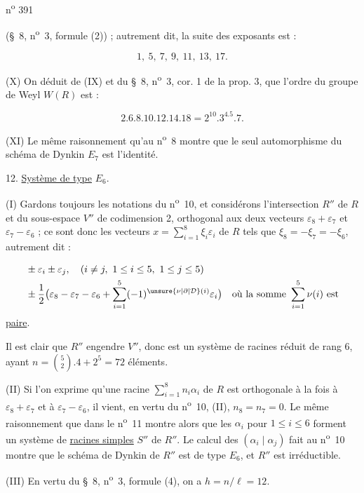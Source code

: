 \hfill n\textsuperscript{o} 391

(\S~8, n\textsuperscript{o}~3, formule (2)) ; autrement dit, la suite des exposants est :

\[
1,\ 5,\ 7,\ 9,\ 11,\ 13,\ 17.
\]

(X) On déduit de (IX) et du \S~8, n\textsuperscript{o}~3, cor. 1 de la prop. 3, que l'ordre du groupe de Weyl $W(R)$ est :

\[
2.6.8.10.12.14.18=2^{10}.3^4.5.7.
\]

(XI) Le même raisonnement qu'au n\textsuperscript{o}~8 montre que le seul automorphisme du schéma de Dynkin $E_7$ est l'identité.

12. \uline{Système de type} $E_6$.

(I) Gardons toujours les notations du n\textsuperscript{o}~10, et considérons l'intersection $R''$ de $R$ et du sous-espace $V''$ de codimension 2, orthogonal aux deux vecteurs $\varepsilon_8+\varepsilon_7$ et $\varepsilon_7-\varepsilon_6$ ; ce sont donc les vecteurs $x=\displaystyle\sum_{i=1}^{8}\xi_i\varepsilon_i$ de $R$ tels que $\xi_8=-\xi_7=-\xi_6$, autrement dit :

\[
\begin{aligned}
&\pm\varepsilon_i\pm\varepsilon_j,\quad(i\neq j,\ 1\leq i\leq5,\ 1\leq j\leq5)\\
&\pm\frac{1}{2}\bigl(\varepsilon_8-\varepsilon_7-\varepsilon_6+\sum_{i=1}^{5}(-1)^{\unsure{\nu|\partial|\mathcal D}(i)}\varepsilon_i\bigr)
\quad\text{où la somme }\sum_{i=1}^{5}\nu(i)\text{ est}
\end{aligned}
\]
\uline{paire}.

Il est clair que $R''$ engendre $V''$, donc est un système de racines réduit de rang 6, ayant $n=\binom{5}{2}.4+2^5=72$ éléments.

(II) Si l'on exprime qu'une racine $\displaystyle\sum_{i=1}^{8}n_i\alpha_i$ de $R$ est orthogonale à la fois à $\varepsilon_8+\varepsilon_7$ et à $\varepsilon_7-\varepsilon_6$, il vient, en vertu du n\textsuperscript{o}~10, (II), $n_8=n_7=0$. Le même raisonnement que dans le n\textsuperscript{o}~11 montre alors que les $\alpha_i$ pour $1\leq i\leq6$ forment un système de \uline{racines simples} $S''$ de $R''$. Le calcul des $(\alpha_i\mid\alpha_j)$ fait au n\textsuperscript{o}~10 montre que le schéma de Dynkin de $R''$ est de type $E_6$, et $R''$ est irréductible.

(III) En vertu du \S~8, n\textsuperscript{o}~3, formule (4), on a $h=n/\ell=12$.

